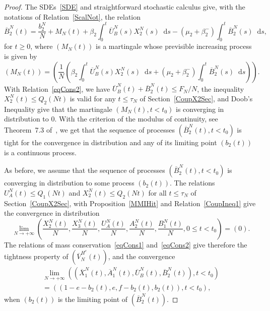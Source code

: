 \documentclass[english]{amsart}
\newcommand{\diff}{\mathop{}\mathopen{}\mathrm{d}}
\numberwithin{proposition}{section}
\begin{document}
\begin{proof}
The SDEs~\eqref{SDE} and straightforward stochastic calculus give, with the notations of Relation~\eqref{ScalNot},  the relation
\begin{equation}\label{B2Eq}
\overline{B}_2^N(t)=\frac{b_2^N}{N}+M_N(t){+}\beta_2\int_0^t\overline{U}_B^N(s)X_2^N(s)\diff s-(\mu_2{+}\beta_2^-)\int_0^t\overline{B}_2^N(s)\diff s,
\end{equation}
for $t\ge 0$, where $(M_N(t))$ is a martingale whose previsible increasing process is given by
\[
\left({M}_N(t)\right)=\left(\frac{1}{N}\left(\beta_2\int_0^t\overline{U}_B^N(s)X_2^N(s)\diff s{+}(\mu_2{+}\beta_2^-)\int_0^t\overline{B}_2^N(s)\diff s\right)\right). 
\]
With Relation~\eqref{eqCons2}, we have $\overline{U}_B^N(t){+}\overline{B}_2^N(t){\le}F_N/N$, the inequality $X_2^N(t){\le} Q_2(Nt)$ is valid for any $t{\le}\tau_N$ of Section~\ref{CoupX2Sec},  and Doob's Inequality give that the martingale $(M_N(t),t{<}t_0)$  is converging in distribution to $0$. With the criterion of the modulus of continuity, see Theorem~7.3 of~\citet{Billingsley}, we get that the sequence of processes $(\overline{B}_2^N(t),t{<}t_0)$ is tight for the convergence in distribution and any of its limiting point  $(b_2(t))$ is a continuous process.

As before, we assume that the sequence of processes $(\overline{B}_2^N(t),t{<}t_0)$ is converging in distribution to some process $(b_2(t))$. 
The relations  $U_A^N(t){\le} Q_1(Nt)$ and $X_2^N(t){\le}Q_2(Nt)$ for all $t{\le}\tau_N$ of Section~\ref{CoupX2Sec}, with Proposition~\ref{MMIHit} and Relation~\eqref{CoupIneq1} give the convergence in distribution
\begin{equation}\label{CoupO1Ineq1}
\lim_{N\to+\infty}\left(\frac{X_2^N(t)}{N},\frac{X_3^N(t)}{N},\frac{U_A^N(t)}{N},\frac{A_2^N(t)}{N},\frac{B_1^N(t)}{N}, 0\le t<t_0\right)=(0).
\end{equation}
The relations of  mass conservation~\eqref{eqCons1} and~\eqref{eqCons2} give therefore the tightness property of $(\overline{V}_N^{H^c}(t))$, and  the convergence
\begin{multline}\label{CvM1LT}
\lim_{N\to+\infty}\left(\left(\overline{X}_1^N(t),\overline{A}_1^N(t),\overline{U}_B^N(t),\overline{B}_2^N(t)\right),t{<}t_0\right)\\=
((1-e-b_2(t),e,f-b_2(t),b_2(t)), t{<}t_0),
\end{multline}
when $(b_2(t))$ is the limiting point of $(\overline{B}_2^N(t))$. 



\end{proof}
\end{document}
